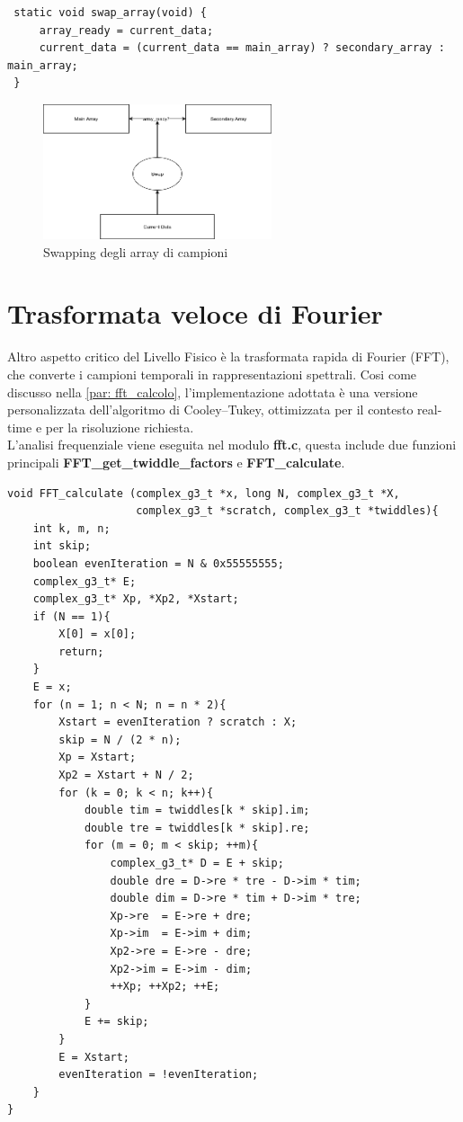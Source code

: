 \begin{verbatim}
 static void swap_array(void) {
     array_ready = current_data;
     current_data = (current_data == main_array) ? secondary_array : main_array;
 }
 \end{verbatim}

\begin{figure}[H]
    \centering
    \includegraphics[width=0.6\textwidth]{immagini/swapping_array.png}
    \caption{Swapping degli array di campioni}
    \label{fig:swapping_array}
\end{figure}

\section{Trasformata veloce di Fourier}
Altro aspetto critico del Livello Fisico è la trasformata rapida di Fourier (FFT), che converte i campioni temporali in rappresentazioni spettrali. 
Cosi come discusso nella \autoref{par: fft_calcolo}, l’implementazione adottata è una versione personalizzata dell’algoritmo di Cooley–Tukey, ottimizzata per
 il contesto real-time e per la risoluzione richiesta. \\
 L'analisi frequenziale viene eseguita nel modulo \textbf{fft.c}, questa include due funzioni principali \textbf{FFT\_get\_twiddle\_factors} e \textbf{FFT\_calculate}. \\

\begin{verbatim}
void FFT_calculate (complex_g3_t *x, long N, complex_g3_t *X,
                    complex_g3_t *scratch, complex_g3_t *twiddles){
    int k, m, n;
    int skip;
    boolean evenIteration = N & 0x55555555;
    complex_g3_t* E;
    complex_g3_t* Xp, *Xp2, *Xstart;
    if (N == 1){
        X[0] = x[0];
        return;
    }
    E = x;
    for (n = 1; n < N; n = n * 2){
        Xstart = evenIteration ? scratch : X;
        skip = N / (2 * n);
        Xp = Xstart;
        Xp2 = Xstart + N / 2;
        for (k = 0; k < n; k++){
            double tim = twiddles[k * skip].im;
            double tre = twiddles[k * skip].re;
            for (m = 0; m < skip; ++m){
                complex_g3_t* D = E + skip;
                double dre = D->re * tre - D->im * tim;
                double dim = D->re * tim + D->im * tre;
                Xp->re  = E->re + dre;
                Xp->im  = E->im + dim;
                Xp2->re = E->re - dre;
                Xp2->im = E->im - dim;
                ++Xp; ++Xp2; ++E;
            }
            E += skip;
        }
        E = Xstart;
        evenIteration = !evenIteration;
    }
}
\end{verbatim}

